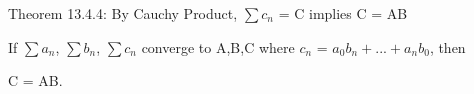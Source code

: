     \vspace{0.5cm}

{ \color{red} Theorem 13.4.4: By Cauchy Product, $\sum c_n$ = C implies C = AB }

    \begin{adjustbox}{minipage=14cm, right, vspace=0.1cm 0cm}
        If $\sum a_n$, $\sum b_n$, $\sum c_n$ converge to A,B,C
        where $c_n$ = $a_0b_n + ... + a_nb_0$, then
        
        C = AB.
    \end{adjustbox}

























